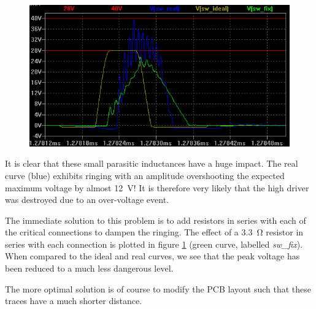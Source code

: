 \begin{figure}[th!]
    \centering
    \includegraphics[width=.7\textwidth]{images/sim/lt3741-transients-sim.png}
    \caption{}
    \label{fig:verification:long_traces_simulation}
\end{figure}

It is clear that these small parasitic  inductances have a huge impact. The real
curve  (blue) exhibits ringing  with  an  amplitude  overshooting  the  expected
maximum voltage by  almost  \SI{12}{\volt}! It is therefore very likely that the
high driver was destroyed due to an over-voltage event.

The immediate solution to this problem  is  to add resistors in series with each
of  the  critical  connections  to  dampen  the  ringing.  The   effect   of   a
\SI{3.3}{\ohm} resistor in series  with  each  connection  is  plotted in figure
\ref{fig:verification:long_traces_simulation}     (green     curve,     labelled
\emph{sw\_fix}). When compared  to  the  ideal  and real curves, we see that the
peak voltage has been reduced to a much less dangerous level.

The more optimal  solution is of course to modify the PCB layout such that these
traces have a much shorter distance.

